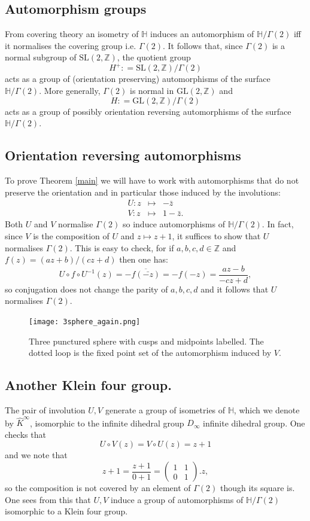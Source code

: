 \documentclass[12pt,a4paper]{amsart}
\def\HH{\mathbb{H}}
\def\xx{\HH/g2}
\def\ZZ{\mathbb{Z}}
\def\gl2{\mathrm{GL}(2, \ZZ)}
\def\sl2{\mathrm{SL}(2, \ZZ)}
\def\g2{\Gamma(2)}
\def\xx{\HH/\g2}
\begin{document}
\subsection{Automorphism groups}
From covering theory an isometry  of $\HH$ 
induces an automorphism of $\xx$ iff it normalises the covering group
i.e. $\g2$.
It follows that,
since $\g2$ is a normal subgroup of $\sl2$,
 the quotient group
$$H^+: = \sl2/\g2$$
acts as a group of (orientation preserving) automorphisms of the surface $\xx$.
More generally, $\g2$ is normal in $\gl2$ and 
$$H: = \gl2/\g2$$
acts as a group of possibly orientation reversing  automorphisms of the surface $\xx$.


\subsection{Orientation reversing automorphisms}
To prove Theorem \ref{main} we will have to work with automorphisms
that do not preserve the orientation and in particular 
those induced by the involutions:
\begin{eqnarray*}
U: z &\mapsto& -\bar{z} \\
V: z &\mapsto& 1 -\bar{z}.
\end{eqnarray*}
Both $U$ and $V$ normalise $\g2$ so induce automorphisms of $\xx$.
In fact, since $V$ is the composition of $U$ and $z \mapsto z + 1$,
it suffices to show that $U$ normalises $\g2$.
This is easy to check, for if  $a,b,c,d \in \ZZ$ 
and  $f(z) = (az + b)/ (cz +d )$  then one has:
$$ U\circ f \circ U^{-1} (z) =  -\overline{f(\bar{-z})} = -f(-z) =   \frac{az - b}{-cz +d }, $$
  so conjugation does not change the parity of $a,b,c,d$ 
  and it follows that  $U$ normalises $\g2$.


 \begin{figure}[hb]
\begin{center}
\texttt{[image: 3sphere\_again.png]} 
\end{center}
\caption{Three punctured sphere with cusps and midpoints labelled.
The dotted loop is the fixed point set of the automorphism induced by $V$.}
 \label{3punctured}
\end{figure}



\subsection{Another Klein four group.}

The pair of involution $U,V$ generate a group 
of isometries of $\HH$,  which we denote by $\hat{K}^\infty$, 
 isomorphic to the infinite dihedral group $D_\infty$
infinite dihedral group. One checks that 
$$U\circ V (z) = V \circ U (z) = z + 1$$
and we note that 
$$  z + 1 = \frac{z+ 1}{ 0 + 1} = \begin{pmatrix}
1 & 1 \\ 0 & 1
\end{pmatrix}. z,$$
so the composition is not covered  by an element of $\g2$ though its square is.
One sees  from this that 
$U,V$ induce a  group of automorphisms of $\xx$ isomorphic to  a Klein four group.
\end{document}

